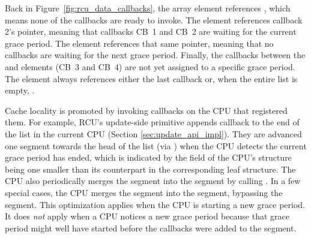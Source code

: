 Back in Figure~\ref{fig:rcu_data_callbacks}, the
 array element references , 
which means none of the callbacks are ready to invoke.
The  element references callback 2's 
pointer, meaning that callbacks CB~1 and CB~2 are waiting for the current
grace period.
The  element references that same 
pointer, meaning that no callbacks are waiting for the next grace period. 
Finally, the callbacks between the  and
 elements (CB~3 and CB~4)
are not yet assigned to a specific grace period.
The  element always references either
the last callback or, when the entire list is empty, .

Cache locality is promoted by invoking callbacks on the CPU that registered
them.
For example, RCU's update-side primitive 
 appends callback  to the end
of the  list in the current CPU 
(Section \ref{sec:update_api_impl}). 
They are advanced one segment towards the head of the list (via ) 
when the CPU detects the current grace period has ended, which is indicated 
by the  field of the CPU's  structure being one
smaller than its counterpart in the corresponding leaf  structure.
The CPU also periodically merges the  segment into the
 segment by calling .
In a few special cases, the CPU merges the  segment
into the  segment, bypassing the 
segment.
This optimization applies when the CPU is starting a new grace period.
It does \emph{not} apply when a CPU notices a new grace period
because that grace period might well have started before
the callbacks were added to the  segment.
